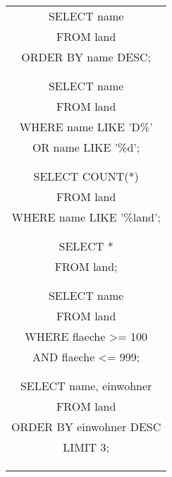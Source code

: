 {{        }{
            \setcounter{tmp}{1}
            \begin{tabularx}{\textwidth}{C}
                \\
                SELECT name\\
                FROM land  \\
                ORDER BY name DESC;\\\\\hline\\
                SELECT name \\
                FROM land \\
                WHERE name LIKE 'D\%'  \\
                OR name LIKE '\%d';\\\\\hline\\
                SELECT COUNT(*) \\
                FROM land \\
                WHERE name LIKE '\%land';\\\\\hline\\
                SELECT * \\
                FROM land;\\\\\hline\\
                SELECT name  \\
                FROM land \\
                WHERE flaeche >= 100  \\
                AND flaeche <= 999;\\\\\hline\\
                SELECT name, einwohner \\
                FROM land  \\
                ORDER BY einwohner DESC \\
                LIMIT 3;\\\\\hline\\

\end{tabularx}}}
